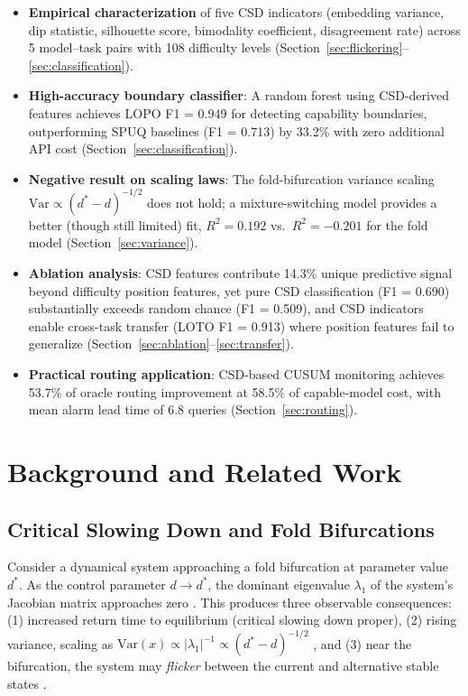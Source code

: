 \documentclass[11pt,letterpaper]{article}
\begin{document}
\begin{itemize}
\item \textbf{Empirical characterization} of five CSD indicators (embedding variance, dip statistic, silhouette score, bimodality coefficient, disagreement rate) across 5 model--task pairs with 108 difficulty levels (Section~\ref{sec:flickering}--\ref{sec:classification}).
\item \textbf{High-accuracy boundary classifier}: A random forest using CSD-derived features achieves LOPO F1 = 0.949 for detecting capability boundaries, outperforming SPUQ baselines (F1 = 0.713) by 33.2\% with zero additional API cost (Section~\ref{sec:classification}).
\item \textbf{Negative result on scaling laws}: The fold-bifurcation variance scaling $\text{Var} \propto (d^* - d)^{-1/2}$ does not hold; a mixture-switching model provides a better (though still limited) fit, $R^2 = 0.192$ vs.\ $R^2 = -0.201$ for the fold model (Section~\ref{sec:variance}).
\item \textbf{Ablation analysis}: CSD features contribute 14.3\% unique predictive signal beyond difficulty position features, yet pure CSD classification (F1 = 0.690) substantially exceeds random chance (F1 = 0.509), and CSD indicators enable cross-task transfer (LOTO F1 = 0.913) where position features fail to generalize (Section~\ref{sec:ablation}--\ref{sec:transfer}).
\item \textbf{Practical routing application}: CSD-based CUSUM monitoring achieves 53.7\% of oracle routing improvement at 58.5\% of capable-model cost, with mean alarm lead time of 6.8 queries (Section~\ref{sec:routing}).
\end{itemize}


\section{Background and Related Work}

\subsection{Critical Slowing Down and Fold Bifurcations}

Consider a dynamical system approaching a fold bifurcation at parameter value $d^*$. As the control parameter $d \to d^*$, the dominant eigenvalue $\lambda_1$ of the system's Jacobian matrix approaches zero \citep{Strogatz2015}. This produces three observable consequences: (1) increased return time to equilibrium (critical slowing down proper), (2) rising variance, scaling as $\text{Var}(x) \propto |\lambda_1|^{-1} \propto (d^* - d)^{-1/2}$ \citep{Wissel1984, Carpenter2006}, and (3) near the bifurcation, the system may \emph{flicker} between the current and alternative stable states \citep{Scheffer2009}.
\end{document}
